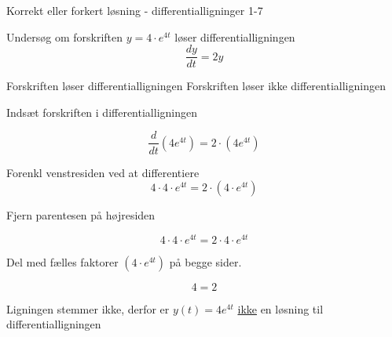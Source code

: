 \documentclass{article}
\begin{document}
\begin{exercise}{Korrekt eller forkert løsning - differentialligninger 1-7}


Undersøg om forskriften $y = 4 \cdot e^{4t}$ løser differentialligningen
\[
\frac{dy}{dt} = 2y
\]

\begin{multichoice}
\itemfalse Forskriften løser differentialligningen
\itemtrue Forskriften løser ikke differentialligningen
\end{multichoice}

\hint

Indsæt forskriften i differentialligningen

\hint
\[
\frac{d}{dt} \left( 4 e^{4t}\right) = 2 \cdot \left( 4 e^{4t} \right)
\]


\hint

Forenkl venstresiden ved at differentiere
\[
4 \cdot 4 \cdot e^{4t} = 2 \cdot \left(4 \cdot e^{4t} \right)
\]

\hint

Fjern parentesen på højresiden

\hint
\[
4 \cdot 4 \cdot e^{4t} = 2 \cdot 4 \cdot e^{4t}
\]

\hint
Del med fælles faktorer $\left( 4 \cdot e^{4t} \right)$ på begge sider.

\hint

\[
4 = 2
\]


\hint

Ligningen stemmer ikke, derfor er $y(t) = 4 e^{4t}$ \underline{ikke} en løsning til differentialligningen

\end{exercise}

\newpage
\end{document}
